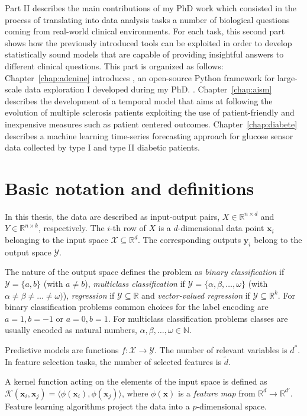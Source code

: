 Part II describes the main contributions of my PhD work which consisted in the process of translating into data analysis tasks a number of biological questions coming from real-world clinical environments. For each task, this second part shows how the previously introduced tools can be exploited in order to develop statistically sound models that are capable of providing insightful answers to different clinical questions.
This part is organized as follows:
Chapter~\ref{chap:adenine} introduces \ade, an open-source Python framework for large-scale data exploration I developed during my PhD. .
Chapter~\ref{chap:aism} describes the development of a temporal model that aims at following the evolution of multiple sclerosis patients exploiting the use of patient-friendly and inexpensive measures such as patient centered outcomes.
Chapter~\ref{chap:diabete} describes a machine learning time-series forecasting approach for glucose sensor data collected by type I and type II diabetic patients.

\chapter{Basic notation and definitions} \label{sec:notation}
In this thesis, the data are described as input-output pairs, $X \in \mathbb{R}^{n \times d}$ and $Y \in \mathbb{R}^{n \times k}$, respectively.
The $i$-th row of $X$ is a $d$-dimensional data point $\bm{x}_{i}$ belonging to the input space $\mathcal{X}\subseteq\mathds{R}^d$. The corresponding outputs $\bm{y}_{i}$ belong to the output space $\mathcal{Y}$.

The nature of the output space defines the problem as \textit{binary classification} if  $\mathcal{Y} = \{a,b\}$ (with $a\neq b$), \textit{multiclass classification} if
$\mathcal{Y} = \{\alpha,\beta,\dots,\omega\}$
(with $\alpha \neq \beta \neq \dots \neq \omega)$),
\textit{regression} if $\mathcal{Y}\subseteq\mathds{R}$ and
\textit{vector-valued regression} if $\mathcal{Y}\subseteq\mathds{R}^k$.
For binary classification problems common choices for the label encoding are $a=1, b=-1$ or $a=0, b=1$.
For multiclass classification problems classes are usually encoded as natural numbers, \ie $\alpha, \beta, \dots, \omega \in \mathbb{N}$.

Predictive models are functions $f: \mathcal{X} \rightarrow \mathcal{Y}$.
The number of relevant variables is $d^*$.
In feature selection tasks, the number of selected features is $\tilde d$.

A kernel function acting on the elements of the input space is defined as $\mathcal{K}(\bm{x}_{i},\bm{x}_{j})=\langle \phi(\bm{x}_{i}), \phi(\bm{x}_{j})\rangle$, where $\phi(\bm{x})$ is a {\em feature map} from $\mathds{R}^d \rightarrow \mathds{R}^{d'}$.
Feature learning algorithms project the data into a $p$-dimensional space.
